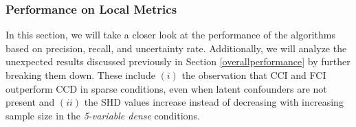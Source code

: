 \documentclass[twoside, 11pt]{article}
\newcommand*{\figref}[2][]{%
  \hyperref[{fig:#2}]{%
    Figure~\ref*{fig:#2}%
    \ifx\\#1\\%
    \else
      #1%
    \fi
  }%
}
\begin{document}






\subsubsection{Performance on Local Metrics} \label{performance-detail}
In this section, we will take a closer look at the performance of the algorithms based on precision, recall, and uncertainty rate.
Additionally, we will analyze the unexpected results discussed previously in Section \ref{overallperformance} by further breaking them down. These include $(i)$ the observation that CCI and FCI outperform CCD in sparse conditions, even when latent confounders are not present and $(ii)$ the SHD values increase instead of decreasing with increasing sample size in the \textit{5-variable dense} conditions.
\end{document}
